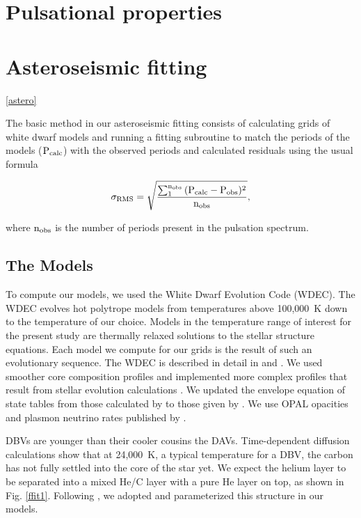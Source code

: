 \documentclass[12pt,preprint]{aastex}
\begin{document}
\section{Pulsational properties}
\label{prop}

\section{Asteroseismic fitting}\ref{astero}
\label{fitting}

The basic method in our asteroseismic fitting consists of calculating grids of white dwarf models and 
running a fitting subroutine to match the periods of the models ($\rm P_{calc}$) with the observed 
periods and calculated residuals using the usual formula

\begin{equation}
\label{fiteq1}
\rm \sigma_{RMS} = \sqrt{\frac{\sum_{1}^{n_{obs}} {(P_{calc}-P_{obs})^2}}{n_{obs}}},
\end{equation}

\noindent where $\rm n_{obs}$ is the number of periods present in the pulsation spectrum.

\subsection{The Models}
\label{models}

To compute our models, we used the White Dwarf Evolution Code (WDEC). The WDEC evolves hot 
polytrope models from temperatures above 100{,}000~K down to the temperature of our choice. 
Models in the temperature range of interest for the present study are thermally relaxed 
solutions to the stellar structure equations. Each model we compute for our grids is the result 
of such an evolutionary sequence. The WDEC is described in detail in \citet{Lamb75} and 
\citet{Wood90}. We used smoother core composition profiles and implemented more complex profiles 
that result from stellar evolution calculations \citep{Salaris97}. We updated the envelope 
equation of state tables from those calculated by \citet{Fontaine77} to those given by 
\citet{Saumon95}. We use OPAL opacities \citep{Iglesias96} and plasmon neutrino rates 
published by \citet{Itoh96}. 

DBVs are younger than their cooler cousins the DAVs. Time-dependent diffusion calculations 
\citep[e.g.][]{Dehner95,Althaus05} show that at 24{,}000~K, a typical temperature for a DBV, 
the carbon has not fully settled into the core of the star yet. We expect the helium layer to 
be separated into a mixed He/C layer with a pure He layer on top, as shown in Fig. \ref{ffit1}. 
Following  \citet{Metcalfe05a}, we adopted and parameterized this structure in our models. 
\end{document}
